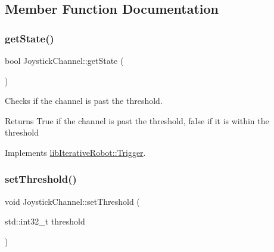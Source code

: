 \subsection{Member Function Documentation}
\mbox{\label{classlib_iterative_robot_1_1_joystick_channel_a2f7c748f53c30fbbde34c14aa494343e}} 
\subsubsection{\texorpdfstring{getState()}{getState()}}
{\footnotesize\ttfamily bool Joystick\+Channel\+::get\+State (\begin{DoxyParamCaption}{ }\end{DoxyParamCaption})\hspace{0.3cm}{\ttfamily [virtual]}}



Checks if the channel is past the threshold. 

\begin{DoxyReturn}{Returns}
True if the channel is past the threshold, false if it is within the threshold 
\end{DoxyReturn}


Implements \mbox{\hyperlink{classlib_iterative_robot_1_1_trigger_a785ea056a56974f2965c71fd0520bb87}{lib\+Iterative\+Robot\+::\+Trigger}}.

\mbox{\label{classlib_iterative_robot_1_1_joystick_channel_a5177f15ef0ffef2e47b14633163d438f}} 
\subsubsection{\texorpdfstring{setThreshold()}{setThreshold()}}
{\footnotesize\ttfamily void Joystick\+Channel\+::set\+Threshold (\begin{DoxyParamCaption}\item[{std\+::int32\+\_\+t}]{threshold }\end{DoxyParamCaption})}



